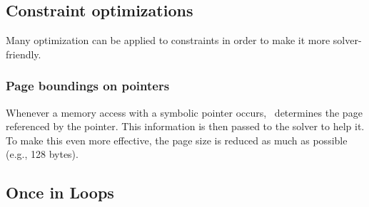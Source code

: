 \subsection{Constraint optimizations}
\label{constraint-optimizations}


Many optimization can be applied to constraints in order to make it more solver-friendly.

\subsubsection{Page boundings on pointers} Whenever a memory access with a symbolic pointer occurs,~\cite{CKC-TOCS12} determines the page referenced by the pointer. This information is then passed to the solver to help it. To make this even more effective, the page size is reduced as much as possible (e.g., 128 bytes).



\subsection{Once in Loops}

